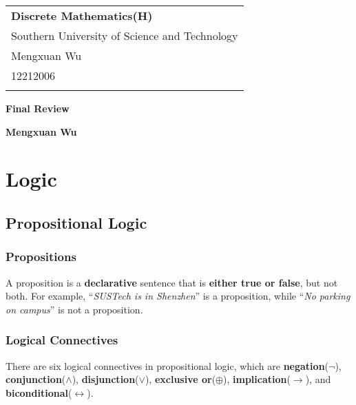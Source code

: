 \documentclass[a4paper,12pt]{article}
\begin{document}
\thispagestyle{empty} %

\begin{tabular}{p{15.5cm}}
{\large \bf Discrete Mathematics(H)} \\
Southern University of Science and Technology \\ Mengxuan Wu \\ 12212006 \\
\hline
\\
\end{tabular}

\vspace*{0.3cm} %

\begin{center}
	{\Large \bf Final Review}
	\vspace{2mm}

	{\bf Mengxuan Wu}
		
\end{center}  

\vspace{0.4cm}

\section{Logic}

\subsection{Propositional Logic}

\subsubsection{Propositions}
A proposition is a \textbf{declarative} sentence that is \textbf{either true or false}, but not both.
For example, ``\textit{SUSTech is in Shenzhen}'' is a proposition, while ``\textit{No parking on campus}'' is not a proposition.

\subsubsection{Logical Connectives}

There are six logical connectives in propositional logic, which are \textbf{negation}($\neg$), \textbf{conjunction}($\wedge$), \textbf{disjunction}($\vee$), \textbf{exclusive or}($\oplus$), \textbf{implication}($\rightarrow$), and \textbf{biconditional}($\leftrightarrow$).
\end{document}
